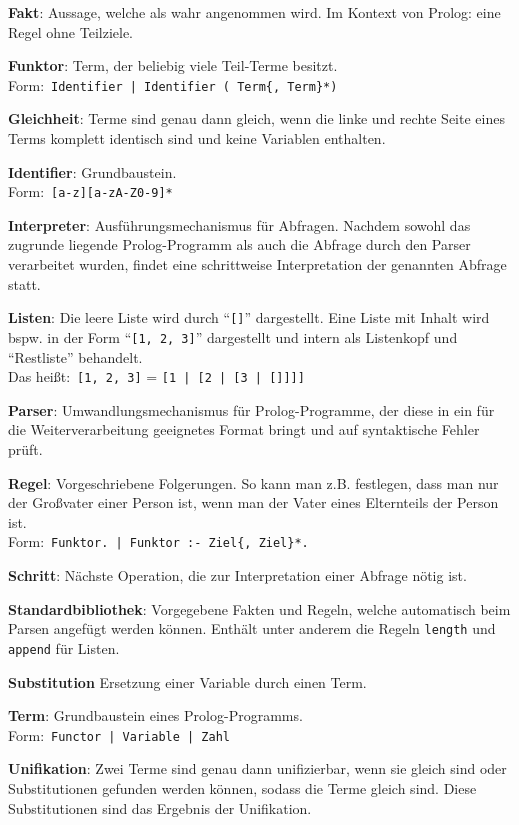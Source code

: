 \documentclass[parskip=full,11pt,twoside]{scrartcl}
\begin{document}
\textbf{Fakt}:
Aussage, welche als wahr angenommen wird. Im Kontext von Prolog: eine Regel ohne Teilziele.

\textbf{Funktor}:
Term, der beliebig viele Teil-Terme besitzt.\\Form:\ \texttt{Identifier | Identifier ( Term\{, Term\}*)}

\textbf{Gleichheit}:
Terme sind genau dann gleich, wenn die linke und rechte Seite eines Terms komplett identisch sind und keine Variablen enthalten.

\textbf{Identifier}:
Grundbaustein.\\Form:\ \texttt{[a-z][a-zA-Z0-9]*}

\textbf{Interpreter}:
Ausführungsmechanismus für Abfragen. Nachdem sowohl das zugrunde liegende Prolog-Programm als auch die Abfrage durch den Parser verarbeitet wurden, findet eine schrittweise Interpretation der genannten Abfrage statt.

\textbf{Listen}:
Die leere Liste wird durch \enquote{\texttt{[]}} dargestellt. Eine Liste mit Inhalt wird bspw. in der Form \enquote{\texttt{[1, 2, 3]}} dargestellt und intern als Listenkopf und \enquote{Restliste} behandelt.\\Das heißt:\ \texttt{[1, 2, 3]} = \texttt{[1 | [2 | [3 | []]]]}

\textbf{Parser}:
Umwandlungsmechanismus für Prolog-Programme, der diese in ein für die Weiterverarbeitung geeignetes Format bringt und auf syntaktische Fehler prüft.

\textbf{Regel}:
Vorgeschriebene Folgerungen. So kann man z.B. festlegen, dass man nur der Großvater einer Person ist, wenn man der Vater eines Elternteils der Person ist.\\Form:\ \texttt{Funktor. | Funktor :- Ziel\{, Ziel\}*.}

\textbf{Schritt}:
Nächste Operation, die zur Interpretation einer Abfrage nötig ist.

\textbf{Standardbibliothek}:
Vorgegebene Fakten und Regeln, welche automatisch beim Parsen angefügt werden können. Enthält unter anderem die Regeln \texttt{length} und \texttt{append} für Listen.

\textbf{Substitution}
Ersetzung einer Variable durch einen Term.

\textbf{Term}:
Grundbaustein eines Prolog-Programms.\\Form:\  \texttt{Functor | Variable | Zahl}

\textbf{Unifikation}:
Zwei Terme sind genau dann unifizierbar, wenn sie gleich sind oder Substitutionen gefunden werden können, sodass die Terme gleich sind. Diese Substitutionen sind das Ergebnis der Unifikation.
\end{document}
